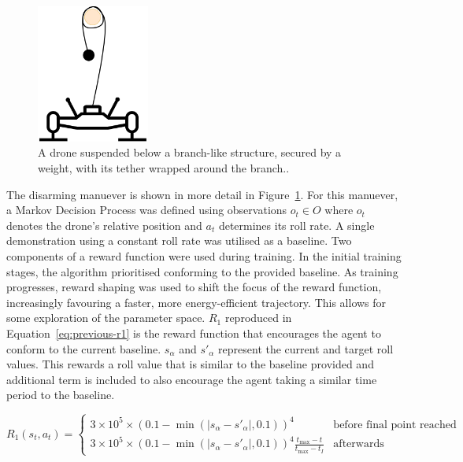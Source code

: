 \begin{figure}[htbp]
  \centering
  \includegraphics[width=0.33\textwidth]{background/disarming-figure.drawio.png}
  \caption{A drone suspended below a branch-like structure, secured by a weight, with its tether wrapped around the branch..}
\label{fig:previous-work-rolling}
\end{figure}

The disarming manuever is shown in more detail in Figure~\ref{fig:previous-work-rolling}.
For this manuever, a Markov Decision Process was defined using observations $o_{t} \in O$ where $o_{t}$ denotes the drone's relative position and $a_{t}$ determines its roll rate.
A single demonstration using a constant roll rate was utilised as a baseline.
Two components of a reward function were used during training.
In the initial training stages, the algorithm prioritised conforming to the provided baseline.
As training progresses, reward shaping was used to shift the focus of the reward function, increasingly favouring a faster, more energy-efficient trajectory.
This allows for some exploration of the parameter space.
$R_1$ reproduced in Equation~\ref{eq:previous-r1} is the reward function that encourages the agent to conform to the current baseline.
$s_{\alpha}$ and $s'_{\alpha}$ represent the current and target roll values.
This rewards a roll value that is similar to the baseline provided and additional term is included to also encourage the agent taking a similar time period to the baseline.

\begin{equation}
  R_{1}(s_{t}, a_{t}) = 
  \begin{cases} 
    3 \times 10 ^ 5 \times (0.1 - \min(|s_{\alpha} - s'_{\alpha}|, 0.1)) ^ 4 & \text{before final point reached}  \\
    3 \times 10 ^ 5 \times (0.1 - \min(|s_{\alpha} - s'_{\alpha}|, 0.1)) ^ 4 \frac{t_{\max} - t}{t_{\max} - t_{I}} & \text{afterwards} 
  \end{cases}
  \label{eq:previous-r1}
\end{equation}

